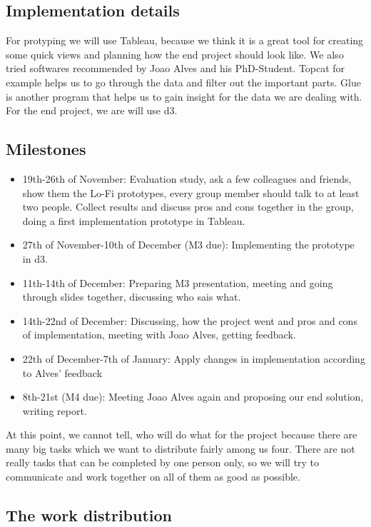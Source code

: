 \documentclass{article}
\begin{document}
\subsection {Implementation details}
For protyping we will use Tableau, because we think it is a great tool for creating some quick views and planning how the end project should look like. We also tried softwares recommended by Joao Alves and his PhD-Student. Topcat for example helps us to go through the data and filter out the important parts. Glue is another program that helps us to gain insight for the data we are dealing with. \\
For the end project, we are will use d3.

\subsection {Milestones}
\begin{itemize}

\item 19th-26th of November: Evaluation study, ask a few colleagues and 		friends, show them the Lo-Fi prototypes, every group member should 	talk to at least two people. Collect results and discuss pros and 		cons together in the group, doing a first implementation prototype 	in Tableau.
\item 	27th of November-10th of December (M3 due): Implementing 	the prototype in d3.
\item 	11th-14th of December: Preparing M3 presentation, meeting and going 		through slides together, discussing who sais what.
\item 	14th-22nd of December: Discussing, how the project went and pros and 	cons of implementation, meeting with Joao Alves, getting feedback.
\item 	22th of December-7th of January: Apply changes in 		implementation according to Alves' feedback
\item 	8th-21st (M4 due): Meeting Joao Alves again and proposing our end 	solution, writing report.
\end{itemize}
At this point, we cannot tell, who will do what for the project because there are many big tasks which we want to distribute fairly among us four. There are not really tasks that can be completed by one person only, so we will try to communicate and work together on all of them as good as possible.

\subsection {The work distribution}
\end{document}
